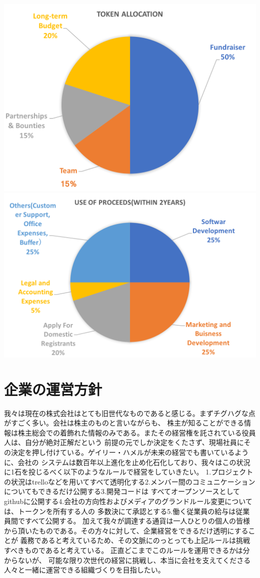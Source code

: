 \documentclass{jsarticle}
\begin{document}
	\includegraphics[scale=0.4]{img/tokenallocation.png}
	\includegraphics[scale=0.4]{img/useofproceeds.png}
\section{企業の運営方針}
我々は現在の株式会社はとても旧世代なものであると感じる。まずチグハグな点がすごく多い。会社は株主のものと言いながらも、
株主が知ることができる情報は株主総会での着飾れた情報のみである。またその経営権を託されている役員人は、自分が絶対正解だという
前提の元でしか決定をくたさず、現場社員にその決定を押し付けている。ゲイリー・ハメルが未来の経営でも書いているように、会社の
システムは数百年以上進化を止め化石化しており、我々はこの状況に1石を投じるべく以下のようなルールで経営をしていきたい。
1.プロジェクトの状況はtrelloなどを用いてすべて透明化する2.メンバー間のコミュニケーションについてもできるだけ公開する3.開発コードは
すべてオープンソースとしてgithubに公開する4.会社の方向性およびメディアのグランドルール変更については、トークンを所有する人の
多数決にて承認とする5.働く従業員の給与は従業員間ですべて公開する。 
加えて我々が調達する通貨は一人ひとりの個人の皆様から頂いたものである。その方々に対して、企業経営をできるだけ透明にすることが
義務であると考えているため、その文脈にのっとっても上記ルールは挑戦すべきものであると考えている。
正直どこまでこのルールを運用できるかは分からないが、
可能な限り次世代の経営に挑戦し、本当に会社を支えてくださる人々と一緒に運営できる組織づくりを目指したい。
\end{document}

